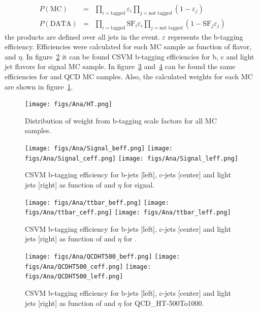 \begin{eqnarray}
  \label{eq:DataMCSFP}
  P(\text{MC}) & = & \prod_{i=\text{tagged}} \varepsilon_i \prod_{j=\text{not tagged}} (1-\varepsilon_j) \\
  P(\text{DATA}) & = & \prod_{i=\text{tagged}} \text{SF}_i \varepsilon_i \prod_{j=\text{not tagged}} (1-\text{SF}_j \varepsilon_j)
\end{eqnarray}the products are defined over all jets in the event. $\varepsilon$ represents the b-tagging efficiency. Efficiencies were calculated for each MC sample as function of flavor, \pt and $\eta$. In figure~\ref{fig:SignalBEff} it can be found CSVM b-tagging efficiencies for b, c and light jet flavors for signal MC sample. In figure~\ref{fig:ttbarBEff} and~\ref{fig:QCDBEff} can be found the same efficiencies for \ttbar and QCD MC samples. Also, the calculated weights for each MC are shown in figure~\ref{fig:SFweight}. 

\begin{figure}[!Hhtbp]
  \begin{center}
    \texttt{[image: figs/Ana/HT.png]}
    \caption{Distribution of weight from b-tagging scale factors for all MC samples.}
    \label{fig:SFweight}
  \end{center}
\end{figure}

\begin{figure}[!Hhtbp]
  \begin{center}
    \texttt{[image: figs/Ana/Signal\_beff.png]}
    \texttt{[image: figs/Ana/Signal\_ceff.png]}
    \texttt{[image: figs/Ana/Signal\_leff.png]}
    \caption{CSVM b-tagging efficiency for b-jets [left], c-jets [center] and light jets [right] as function of \pt and $\eta$ for signal.}
    \label{fig:SignalBEff}
  \end{center}
\end{figure}

\begin{figure}[!Hhtbp]
  \begin{center}
    \texttt{[image: figs/Ana/ttbar\_beff.png]}
    \texttt{[image: figs/Ana/ttbar\_ceff.png]}
    \texttt{[image: figs/Ana/ttbar\_leff.png]}
    \caption{CSVM b-tagging efficiency for b-jets [left], c-jets [center] and light jets [right] as function of \pt and $\eta$ for \ttbar.}
    \label{fig:ttbarBEff}
  \end{center}
\end{figure}

\begin{figure}[!Hhtbp]
  \begin{center}
    \texttt{[image: figs/Ana/QCDHT500\_beff.png]}
    \texttt{[image: figs/Ana/QCDHT500\_ceff.png]}
    \texttt{[image: figs/Ana/QCDHT500\_leff.png]}
    \caption{CSVM b-tagging efficiency for b-jets [left], c-jets [center] and light jets [right] as function of \pt and $\eta$ for QCD\_HT-500To1000.}
    \label{fig:QCDBEff}
  \end{center}
\end{figure}

